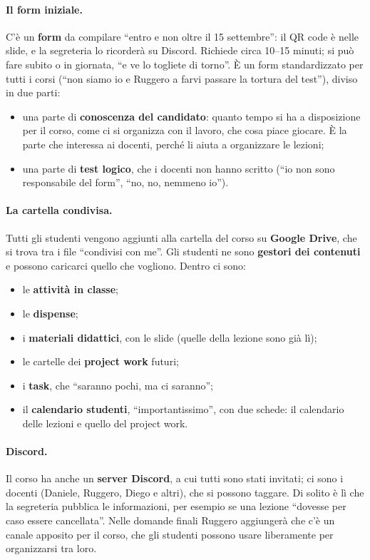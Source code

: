 \paragraph{Il form iniziale.} C'è un \textbf{form} da compilare ``entro e non
oltre il 15 settembre'': il QR code è nelle slide, e la segreteria lo ricorderà
su Discord. Richiede circa 10--15 minuti; si può fare subito o in giornata, ``e
ve lo togliete di torno''. È un form standardizzato per tutti i corsi (``non
siamo io e Ruggero a farvi passare la tortura del test''), diviso in due parti:
\begin{itemize}
  \item una parte di \textbf{conoscenza del candidato}: quanto tempo si ha a
        disposizione per il corso, come ci si organizza con il lavoro, che cosa
        piace giocare. È la parte che interessa ai docenti, perché li aiuta a
        organizzare le lezioni;
  \item una parte di \textbf{test logico}, che i docenti non hanno scritto (``io
        non sono responsabile del form'', ``no, no, nemmeno io'').
\end{itemize}

\paragraph{La cartella condivisa.} Tutti gli studenti vengono aggiunti alla
cartella del corso su \textbf{Google Drive}, che si trova tra i file
``condivisi con me''. Gli studenti ne sono \textbf{gestori dei contenuti} e
possono caricarci quello che vogliono. Dentro ci sono:
\begin{itemize}
  \item le \textbf{attività in classe};
  \item le \textbf{dispense};
  \item i \textbf{materiali didattici}, con le slide (quelle della lezione sono
        già lì);
  \item le cartelle dei \textbf{project work} futuri;
  \item i \textbf{task}, che ``saranno pochi, ma ci saranno'';
  \item il \textbf{calendario studenti}, ``importantissimo'', con due schede: il
        calendario delle lezioni e quello del project work.
\end{itemize}

\paragraph{Discord.} Il corso ha anche un \textbf{server Discord}, a cui tutti
sono stati invitati; ci sono i docenti (Daniele, Ruggero, Diego e altri), che si
possono taggare. Di solito è lì che la segreteria pubblica le informazioni, per
esempio se una lezione ``dovesse per caso essere cancellata''. Nelle domande
finali Ruggero aggiungerà che c'è un canale apposito per il corso, che gli
studenti possono usare liberamente per organizzarsi tra loro.

